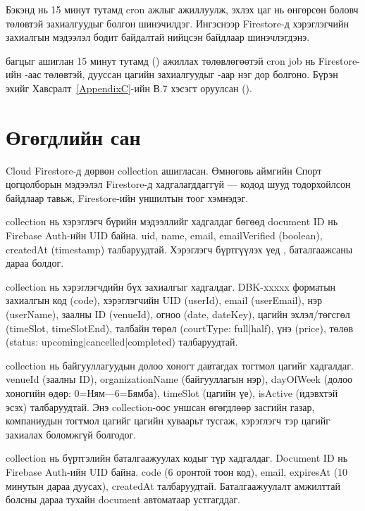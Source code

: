 Бэкэнд нь 15 минут тутамд cron ажлыг ажиллуулж, эхлэх цаг нь өнгөрсөн боловч  төлөвтэй захиалгуудыг  болгон шинэчилдэг. Ингэснээр Firestore-д хэрэглэгчийн захиалгын мэдээлэл бодит байдалтай нийцсэн байдлаар шинэчлэгдэнэ.

 багцыг ашиглан 15 минут тутамд () ажиллах төлөвлөгөөтэй cron job нь Firestore-ийн -аас  төлөвтэй, дууссан цагийн захиалгуудыг -аар нэг дор  болгоно. Бүрэн эхийг Хавсралт~\ref{AppendixC}-ийн В.7 хэсэгт оруулсан ().


\section{Өгөгдлийн сан}

Cloud Firestore-д дөрвөн collection ашигласан. Өмнөговь аймгийн Спорт цогцолборын мэдээлэл Firestore-д хадгалагддаггүй --- кодод шууд тодорхойлсон байдлаар тавьж, Firestore-ийн уншилтын тоог хэмнэдэг.

 collection нь хэрэглэгч бүрийн мэдээллийг хадгалдаг бөгөөд document ID нь Firebase Auth-ийн UID байна. uid, name, email, emailVerified (boolean), createdAt (timestamp) талбаруудтай. Хэрэглэгч бүртгүүлэх үед , баталгаажсаны дараа  болдог.

 collection нь хэрэглэгчдийн бүх захиалгыг хадгалдаг. DBK-xxxxx форматын захиалгын код (code), хэрэглэгчийн UID (userId), email (userEmail), нэр (userName), заалны ID (venueId), огноо (date, dateKey), цагийн эхлэл/төгсгөл (timeSlot, timeSlotEnd), талбайн төрөл (courtType: full|half), үнэ (price), төлөв (status: upcoming|cancelled|completed) талбаруудтай.

 collection нь байгууллагуудын долоо хоногт давтагдах тогтмол цагийг хадгалдаг. venueId (заалны ID), organizationName (байгууллагын нэр), dayOfWeek (долоо хоногийн өдөр: 0=Ням---6=Бямба), timeSlot (цагийн үе), isActive (идэвхтэй эсэх) талбаруудтай. Энэ collection-оос уншсан өгөгдлөөр засгийн газар, компаниудын тогтмол цагийг цагийн хуваарьт тусгаж, хэрэглэгч тэр цагийг захиалах боломжгүй болгодог.

 collection нь бүртгэлийн баталгаажуулах кодыг түр хадгалдаг. Document ID нь Firebase Auth-ийн UID байна. code (6 оронтой тоон код), email, expiresAt (10 минутын дараа дуусах), createdAt талбаруудтай. Баталгаажуулалт амжилттай болсны дараа тухайн document автоматаар устгагддаг.


